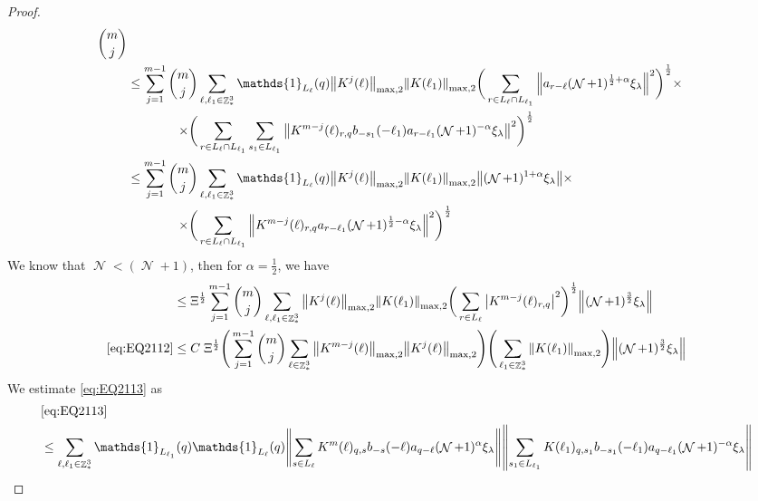 \documentclass[12pt,a4paper]{article}
\numberwithin{equation}{section}
\newcommand{\1}{\mathbb{I}}
\DeclareMathOperator{\Z}{\mathbb{Z}}
\DeclareMathOperator{\NN}{\mathcal{N}}
\newcommand{\half}{\frac{1}{2}}
\newcommand{\normmaxii}[1]{\norm{#1}_{\mathrm{max,2}}}
\theoremstyle{plain}
\theoremstyle{definition}
\theoremstyle{remark}
\theoremstyle{plain}
\theoremstyle{definition}
\theoremstyle{remark}
\begin{document}
\begin{proof}
\begin{alignat}{2}
\begin{aligned}[t] {{m}\choose j}
    \end{aligned} \nonumber\\   
	&\leq \sum\limits_{j=1}^{m-1} \begin{aligned}[t]{{m}\choose j} &\sum\limits_{\ell,\ell_1 \in \Z^3_*} \mathds{1}_{L_{\ell}}(q) \normmaxii{K^j(\ell)} \normmaxii{K(\ell_1)} 
    \bigg( \sum\limits_{r\in L_{\ell} \cap L_{\ell_1}} \norm{ a_{r-\ell} (\NN+1)^{\half+\alpha}\xi_\lambda}^2\bigg)^\half \times \nonumber\\ \times 
    \bigg( &\sum\limits_{r\in L_{\ell} \cap L_{\ell_1}} \sum\limits_{s_1 \in L_{\ell_1}}\norm{ K^{m-j}(\ell)_{r,q}  b_{-s_1}(-\ell_1)  a_{r-\ell_1} (\NN+1)^{-\alpha}\xi_\lambda }^2\bigg)^\half
	\end{aligned} \nonumber\\
	&\leq \sum\limits_{j=1}^{m-1} \begin{aligned}[t]{{m}\choose j} &\sum\limits_{\ell,\ell_1 \in \Z^3_*} \mathds{1}_{L_{\ell}}(q) \normmaxii{K^j(\ell)} \normmaxii{K(\ell_1)}  
	 \norm{ (\NN+1)^{1+\alpha}\xi_\lambda} \times \nonumber\\ \times 
	\bigg( &\sum\limits_{r\in L_{\ell}\cap L_{\ell_1}}  \norm{ K^{m-j}(\ell)_{r,q} a_{r-\ell_1} (\NN+1)^{\half-\alpha}\xi_\lambda }^2\bigg)^\half \end{aligned} \nonumber\\
\end{alignat}
We know that $\NN<(\NN+1)$, then for $\alpha = \half$, we have
\begin{alignat}{2}
	&\leq \Xi^\half\sum\limits_{j=1}^{m-1} {{m}\choose j} \sum\limits_{\ell, \ell_1\in \Z^3_*} \normmaxii{K^j(\ell)} \normmaxii{K(\ell_1)} \bigg(\sum\limits_{r\in L_\ell}  \abs{ K^{m-j}(\ell)_{r,q} }^2\bigg)^\half \norm{(\NN+1)^\frac{3}{2} \xi_\lambda}  \nonumber\\
  	\eqref{eq:EQ2112}&\leq C\;\Xi^\half \Bigg(\sum\limits_{j=1}^{m-1} {{m}\choose j} \sum\limits_{\ell \in \Z^3_*} \norm{K^{m-j}(\ell)}_{ \mathrm{max,2} } \norm{K^{j}(\ell)}_{\mathrm{max,2}}\Bigg) \Bigg(\sum\limits_{ \ell_1\in \Z^3_*} \norm{K(\ell_1)}_{\mathrm{max,2}}\Bigg)  \norm{(\NN+1)^{\frac{3}{2}} \xi_\lambda} \label{eq:estEQ2112}
  \end{alignat} 
We estimate \eqref{eq:EQ2113} as
\begin{align}
	&\eqref{eq:EQ2113}\nonumber\\
	&\leq\sum\limits_{\ell, \ell_1\in \Z^3_*} \mathds{1}_{L_{\ell_1}}(q) \mathds{1}_{L_{\ell}}(q)  \norm{ \sum\limits_{s\in L_{\ell}} K^m(\ell)_{q,s} b_{-s}(-\ell) a_{q-\ell}(\NN+1)^{\alpha}\xi_\lambda}\norm{ \sum\limits_{s_1 \in L_{\ell_1}} K(\ell_1)_{q,s_1} b_{-s_1}(-\ell_1)a_{q-\ell_1} (\NN+1)^{-\alpha} \xi_\lambda }\nonumber\\

\end{align}
\end{proof}
\end{document}
